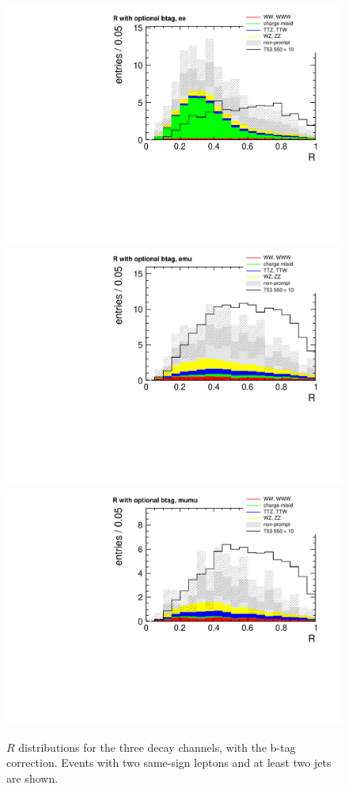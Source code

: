 \begin{figure}[htb]
    \centering
    \includegraphics[width=.7\textwidth]{images/pdf/r_optional_btag_ee_0}
    \includegraphics[width=.7\textwidth]{images/pdf/r_optional_btag_emu_0}
    \includegraphics[width=.7\textwidth]{images/pdf/r_optional_btag_mumu_0}
    \caption{$R$ distributions for the three decay channels,
        with the b-tag correction. Events with two same-sign leptons and at least
two jets are shown.}
    \label{fig:r_optional_btag_app}
\end{figure}

